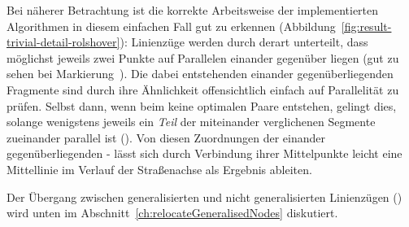 \documentclass[../main/thesis.tex]{subfiles}
\begin{document}
Bei näherer Betrachtung ist die korrekte Arbeitsweise der implementierten Algorithmen in diesem einfachen Fall gut zu erkennen (Abbildung~\ref{fig:result-trivial-detail-rolshover}):
Linienzüge werden durch  derart unterteilt, dass möglichst jeweils zwei Punkte auf Parallelen einander gegenüber liegen (gut zu sehen bei Markierung~).
Die dabei entstehenden einander gegenüberliegenden Fragmente sind durch ihre Ähnlichkeit offensichtlich einfach auf Parallelität zu prüfen.
Selbst dann, wenn beim  keine optimalen Paare entstehen, gelingt dies, solange wenigstens jeweils ein \emph{Teil} der miteinander verglichenen Segmente zueinander parallel ist ().
Von diesen Zuordnungen der einander gegenüberliegenden \osm- lässt sich durch Verbindung ihrer Mittelpunkte leicht eine Mittellinie im Verlauf der Straßenachse als Ergebnis ableiten.


Der Übergang zwischen generalisierten und nicht generalisierten Linienzügen () wird unten im Abschnitt~\ref{ch:relocateGeneralisedNodes} diskutiert.
\end{document}
